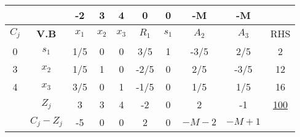 \documentclass{templateNote}
\begin{document}
\newpage
\begin{center}
    \begin{tabular}{|c|c|c|c|c|c|c|c|c|c|}
        \hline
        & & -2 & 3 & 4 & 0 & 0 & -M & -M & \\ \hline
        $C_j$ & \textbf{V.B} & $x_1$ & $x_2$ & $x_3$ & $R_1$ & $s_1$ & $A_2$ & $A_3$ & RHS \\ \hline
        0 & $s_1$ & 1/5 & 0 & 0 & 3/5 & 1 & -3/5 & 2/5 & 2 \\ \hline
        3 & $x_2$ & 1/5 & 1 & 0 & -2/5 & 0 & 2/5 & -3/5 & 12 \\ \hline
        4 & $x_3$ & 3/5 & 0 & 1 & -1/5 & 0 & 1/5 & 1/5 & 16 \\ \hline
        & $Z_j$ & 3 & 3 & 4 & -2 & 0 & 2 & -1 & \underline{100} \\ \hline
        & $C_j - Z_j$ & -5 & 0 & 0 & 2 & 0 & $-M-2$ & $-M+1$ & \\ \hline
    \end{tabular}
\end{center}
\end{document}
